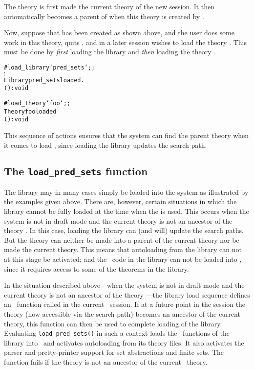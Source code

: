\noindent The theory  is first made the current theory of the
new session.  It then automatically becomes a parent of  when this
theory is created by .

Now, suppose that  has been created as shown above, and the user does
some work in this theory, quits \HOL, and in a later session wishes to load the
theory .  This must be done by {\it first\/} loading the
 library and {\it then\/} loading the theory .

\setcounter{sessioncount}{1}
\begin{session}\begin{alltt}
#load_library `pred_sets`;;
  \(\vdots\)
Library pred_sets loaded.
() : void

#load_theory `foo`;;
Theory foo loaded
() : void
\end{alltt}\end{session}

\noindent This sequence of actions ensures that the system can find the parent
theory  when it comes to load , since loading the
library updates the search path.

\subsection{The {\tt load\_pred\_sets} function}%

The  library may in many cases simply be loaded into the system
as illustrated by the examples given above.  There are, however, certain
situations in which the library cannot be fully loaded at the time when the
 is used.  This occurs when the system is not in draft mode
and the current theory is not an ancestor of the theory .  In
this case, loading the library can (and will) update the search paths.  But the
theory  can neither be made into a parent of the current theory
nor be made the current theory.  This means that autoloading from the library
can not at this stage be activated; and the \ML\ code in the library can not be
loaded into \HOL, since it requires access to some of the theorems in the
library.

In the situation described above---when the system is not in draft mode and the
current theory is not an ancestor of the theory ---the library
load sequence defines an \ML\ function called  in the
current \HOL\ session.  If at a future point in the session the 
theory (now accessible via the search path) becomes an ancestor of the current
theory, this function can then be used to complete loading of the library.
Evaluating {\small\verb!load_pred_sets()!} in such a context loads the \ML\
functions of the  library into \HOL\ and activates autoloading
from its theory files.  It also activates the parser and pretty-printer support
for set abstractions and finite sets.  The function \ml{load\_pred\_sets} fails
if the theory \ml{pred\_sets} is not an ancestor of the current \HOL\ theory.

